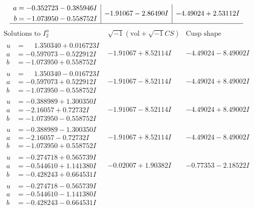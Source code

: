 \documentclass[1p]{elsarticle_modified}
\theoremstyle{definition}
\newcommand{\I}{\sqrt{-1}}
\begin{document}
$$\begin{array}{c|c|c}
\begin{aligned}
a &= -0.352723 - 0.385946 I \\
b &= -1.073950 - 0.558752 I\end{aligned}
 & -1.91067 - 2.86490 I & -4.49024 + 2.53112 I\\
 \hline 
 \end{array}$$\newpage$$\begin{array}{c|c|c}  
\text{Solutions to }I^u_{2}& \I (\text{vol} + \sqrt{-1}CS) & \text{Cusp shape}\\
 \hline 
\begin{aligned}
u &= \phantom{-}1.350340 + 0.016723 I \\
a &= -0.597073 - 0.522912 I \\
b &= -1.073950 + 0.558752 I\end{aligned}
 & -1.91067 + 8.52114 I & -4.49024 - 8.49002 I \\ \hline\begin{aligned}
u &= \phantom{-}1.350340 - 0.016723 I \\
a &= -0.597073 + 0.522912 I \\
b &= -1.073950 - 0.558752 I\end{aligned}
 & -1.91067 - 8.52114 I & -4.49024 + 8.49002 I \\ \hline\begin{aligned}
u &= -0.388989 + 1.300350 I \\
a &= -2.16057 + 0.72732 I \\
b &= -1.073950 - 0.558752 I\end{aligned}
 & -1.91067 - 8.52114 I & -4.49024 + 8.49002 I \\ \hline\begin{aligned}
u &= -0.388989 - 1.300350 I \\
a &= -2.16057 - 0.72732 I \\
b &= -1.073950 + 0.558752 I\end{aligned}
 & -1.91067 + 8.52114 I & -4.49024 - 8.49002 I \\ \hline\begin{aligned}
u &= -0.274718 + 0.565739 I \\
a &= -0.544610 + 1.141380 I \\
b &= -0.428243 + 0.664531 I\end{aligned}
 & -0.02007 + 1.90382 I & -0.77353 - 2.18522 I \\ \hline\begin{aligned}
u &= -0.274718 - 0.565739 I \\
a &= -0.544610 - 1.141380 I \\
b &= -0.428243 - 0.664531 I\end{aligned}

\end{array}$$
\end{document}
